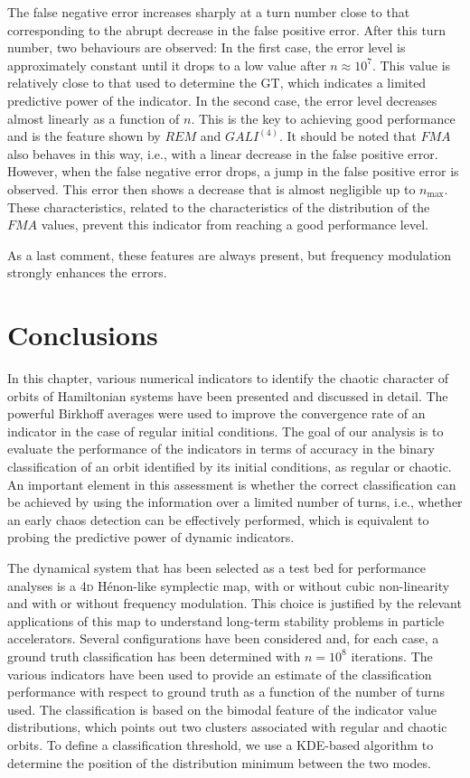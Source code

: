 The false negative error increases sharply at a turn number close to that corresponding to the abrupt decrease in the false positive error. After this turn number, two behaviours are observed: In the first case, the error level is approximately constant until it drops to a low value after $n \approx 10^7$. This value is relatively close to that used to determine the GT, which indicates a limited predictive power of the indicator. In the second case, the error level decreases almost linearly as a function of $n$. This is the key to achieving good performance and is the feature shown by $REM$ and $GALI^{(4)}$. It should be noted that $FMA$ also behaves in this way, i.e., with a linear decrease in the false positive error. However, when the false negative error drops, a jump in the false positive error is observed. This error then shows a decrease that is almost negligible up to $n_\mathrm{max}$. These characteristics, related to the characteristics of the distribution of the $FMA$ values, prevent this indicator from reaching a good performance level. 

As a last comment, these features are always present, but frequency modulation strongly enhances the errors. 
%
\section{\label{sec:dyn:conc} Conclusions}
%
In this chapter, various numerical indicators to identify the chaotic character of orbits of Hamiltonian systems have been presented and discussed in detail. The powerful Birkhoff averages were used to improve the convergence rate of an indicator in the case of regular initial conditions. The goal of our analysis is to evaluate the performance of the indicators in terms of accuracy in the binary classification of an orbit identified by its initial conditions, as regular or chaotic. An important element in this assessment is whether the correct classification can be achieved by using the information over a limited number of turns, i.e., whether an early chaos detection can be effectively performed, which is equivalent to probing the predictive power of dynamic indicators. 

The dynamical system that has been selected as a test bed for performance analyses is a 4\textsc{d} H\'enon-like symplectic map, with or without cubic non-linearity and with or without frequency modulation. This choice is justified by the relevant applications of this map to understand long-term stability problems in particle accelerators. Several configurations have been considered and, for each case, a ground truth classification has been determined with $n=10^8$ iterations. The various indicators have been used to provide an estimate of the classification performance with respect to ground truth as a function of the number of turns used. The classification is based on the bimodal feature of the indicator value distributions, which points out two clusters associated with regular and chaotic orbits. To define a classification threshold, we use a KDE-based algorithm to determine the position of the distribution minimum between the two modes.

